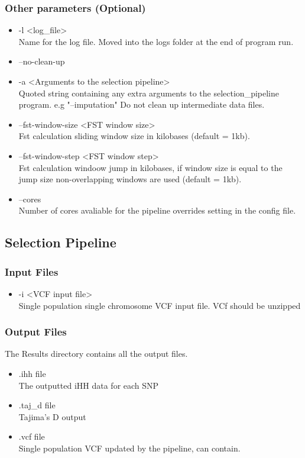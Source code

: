 \documentclass[a4paper,10pt]{article}
\begin{document}
\subsubsection{Other parameters (Optional)}
\begin{itemize}
\item -l <log\_file> \\
Name for the log file. Moved into the logs folder at the end of program run.
\item --no-clean-up\\ 
\item -a <Arguments to the selection pipeline>\\
Quoted string containing any extra arguments to the selection\_pipeline program. e.g "--imputation"
Do not clean up intermediate data files.
\item --fst-window-size <FST window size>\\
Fst calculation sliding window size in kilobases (default = 1kb).
\item --fst-window-step <FST window step>\\
Fst calculation windoow jump in kilobases, if window size is equal to
the jump size non-overlapping windows are used (default = 1kb).
\item --cores \\
Number of cores avaliable for the pipeline overrides setting in the config file.
\end{itemize}
\subsection{Selection Pipeline}
\subsubsection{Input Files}
\begin{itemize}
\item -i <VCF input file>\\
Single population single chromosome VCF input file. VCf should be unzipped
\end{itemize}
\subsubsection{Output Files}
The Results directory contains all the output files.
\begin{itemize}
\item .ihh file\\
The outputted iHH data for each SNP
\item .taj\_d file\\
Tajima's D output
\item .vcf file\\
Single population VCF updated by the pipeline, can contain.
\end{itemize}
\end{document}

